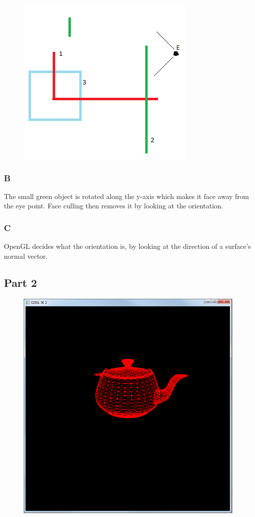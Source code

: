 \documentclass[11pt]{article}
\begin{document}
\begin{figure}[H]
	\centering
	\includegraphics[width=0.5\linewidth]{images/e06p1a}
	\label{fig:e06p1a}
\end{figure}


\subsubsection{B}
The small green object is rotated along the y-axis which makes it face away from the eye point. Face culling then removes it by looking at the orientation.

\subsubsection{C}
OpenGL decides what the orientation is, by looking at the direction of a surface's normal vector.


\subsection{Part 2}
\begin{figure}[H]
	\centering
	\includegraphics[width=0.5\linewidth]{images/e06p2}
	\label{fig:e06p2}
\end{figure}
\end{document}
